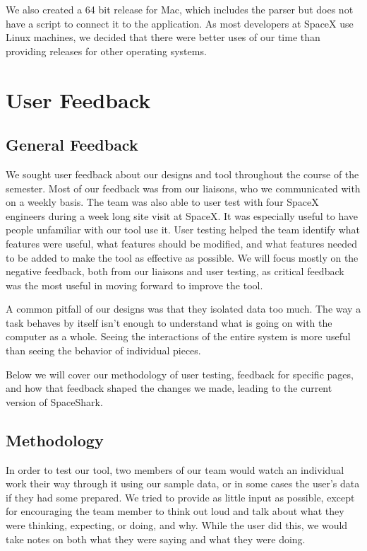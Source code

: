 \documentclass{hmcclinic}
\begin{document}
  We also created a 64 bit release for Mac, which includes the parser but does
  not have a script to connect it to the application. As most developers at
  SpaceX use Linux machines, we decided that there were better uses of our time
  than providing releases for other operating systems.


\chapter{User Feedback} %
\section{General Feedback} %
We sought user feedback about our designs and tool throughout the course of the
semester. Most of our feedback was from our liaisons, who we communicated with
on a weekly basis. The team was also able to user test with four SpaceX
engineers during a week long site visit at SpaceX. It was especially useful to
have people unfamiliar with our tool use it.  User testing helped the team
identify what features were useful, what features should be modified, and what
features needed to be added to make the tool as effective as possible.  We will
focus mostly on the negative feedback, both from our liaisons and user testing,
as critical feedback was the most useful in moving forward to improve the tool.

A common pitfall of our designs was that they isolated data too much. The way a
task behaves by itself isn't enough to understand what is going on with the
computer as a whole. Seeing the interactions of the entire system is more useful
than seeing the behavior of individual pieces.

Below we will cover our methodology of user testing, feedback for specific
pages, and how that feedback shaped the changes we made, leading to the current
version of SpaceShark.

\section{Methodology} %
In order to test our tool, two members of our team would watch an individual
work their way through it using our sample data, or in some cases the user's
data if they had some prepared. We tried to provide as little
input as possible, except for encouraging the team member to think out loud and
talk about what they were thinking, expecting, or doing, and why. While the user
did this, we would take notes on both what they were saying and what they were
doing.
\end{document}
